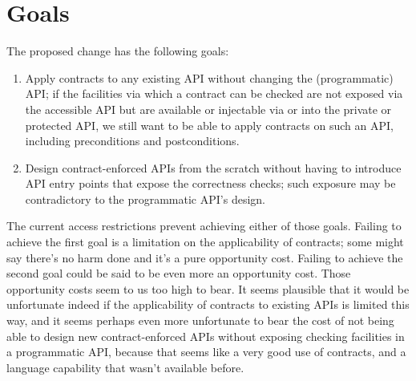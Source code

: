 \section{Goals}

The proposed change has the following goals:

\begin{enumerate}

\item
Apply contracts to any existing API without changing the (programmatic) API; if
the facilities via which a contract can be checked are not exposed via the
accessible API but are available or injectable via or into the private or
protected API, we still want to be able to apply contracts on such an API,
including preconditions and postconditions.

\item
Design contract-enforced APIs from the scratch without having to introduce API
entry points that expose the correctness checks; such exposure may be
contradictory to the programmatic API's design.

\end{enumerate}

The current access restrictions prevent achieving either of those goals.
Failing to achieve the first goal is a limitation on the applicability of
contracts; some might say there's no harm done and it's a pure opportunity
cost. Failing to achieve the second goal could be said to be even more an
opportunity cost. Those opportunity costs seem to us too high to bear. It seems
plausible that it would be unfortunate indeed if the applicability of contracts
to existing APIs is limited this way, and it seems perhaps even more
unfortunate to bear the cost of not being able to design new contract-enforced
APIs without exposing checking facilities in a programmatic API, because that
seems like a very good use of contracts, and a language capability that wasn't
available before.

